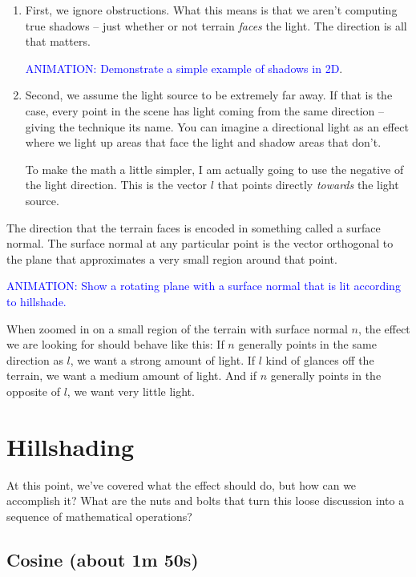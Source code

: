 \documentclass{article}
\newcommand\animation[1]{\textcolor{blue}{ANIMATION: #1}}
\begin{document}
\begin{enumerate}
	
\item First, we ignore obstructions.
What this means is that we aren't computing true shadows -- just whether or not terrain \textit{faces} the light.
The direction is all that matters.

\animation{Demonstrate a simple example of shadows in 2D}.
	
\item Second, we assume the light source to be extremely far away.
If that is the case, every point in the scene has light coming from the same direction -- giving the technique its name.
You can imagine a directional light as an effect where we light up areas that face the light and shadow areas that don't.

To make the math a little simpler, I am actually going to use the negative of the light direction.
This is the vector $l$ that points directly \textit{towards} the light source.

\end{enumerate}

The direction that the terrain faces is encoded in something called a surface normal.
The surface normal at any particular point is the vector orthogonal to the plane that approximates a very small region around that point.

\animation{Show a rotating plane with a surface normal that is lit according to hillshade.}

When zoomed in on a small region of the terrain with surface normal $n$, the effect we are looking for should behave like this:
If $n$ generally points in the same direction as $l$, we want a strong amount of light.
If $l$ kind of glances off the terrain, we want a medium amount of light.
And if $n$ generally points in the opposite of $l$, we want very little light.

\section{Hillshading}

At this point, we've covered what the effect should do, but how can we accomplish it?
What are the nuts and bolts that turn this loose discussion into a sequence of mathematical operations?

\subsection{Cosine (about 1m 50s)}
\end{document}
